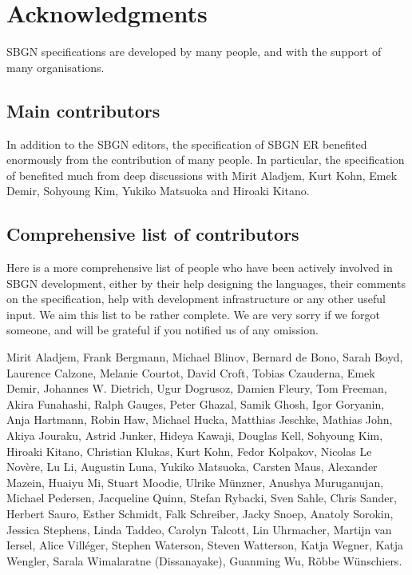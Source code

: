 \chapter{Acknowledgments}\label{sec:acknowledgments}

SBGN specifications are developed by many people, and with the support of many organisations.

\section{Main contributors}

In addition to the SBGN editors, the specification of SBGN ER benefited enormously from the contribution of many people. In particular, the specification of \SBGNERLone benefited much from deep discussions with Mirit Aladjem, Kurt Kohn, Emek Demir, Sohyoung Kim, Yukiko Matsuoka and Hiroaki Kitano. 

\section{Comprehensive list of contributors}

Here is a more comprehensive list of people who have been actively involved in SBGN development, either by their help designing the languages, their comments on the specification, help with development infrastructure or any other useful input.  We aim this list to be rather complete. We are very sorry if we forgot someone, and will be grateful if you notified us of any omission.

Mirit Aladjem, Frank Bergmann, Michael Blinov, Bernard de Bono, Sarah Boyd, Laurence Calzone, Melanie Courtot, David Croft, Tobias Czauderna, Emek Demir, Johannes W. Dietrich, Ugur Dogrusoz, Damien Fleury, Tom Freeman, Akira Funahashi, Ralph Gauges, Peter Ghazal, Samik Ghosh, Igor Goryanin, Anja Hartmann, Robin Haw, Michael Hucka, Matthias Jeschke, Mathias John, Akiya Jouraku, Astrid Junker, Hideya Kawaji, Douglas Kell, Sohyoung Kim, Hiroaki Kitano, Christian Klukas, Kurt Kohn, Fedor Kolpakov, Nicolas Le Nov\`{e}re, Lu Li, Augustin Luna, Yukiko Matsuoka, Carsten Maus, Alexander Mazein, Huaiyu Mi, Stuart Moodie, Ulrike Münzner, Anushya Muruganujan, Michael Pedersen, Jacqueline Quinn, Stefan Rybacki, Sven Sahle, Chris Sander, Herbert Sauro, Esther Schmidt, Falk Schreiber, Jacky Snoep, Anatoly Sorokin, Jessica Stephens, Linda Taddeo, Carolyn Talcott, Lin Uhrmacher, Martijn van Iersel, Alice Vill\'{e}ger, Stephen Waterson, Steven Watterson, Katja Wegner, Katja Wengler, Sarala Wimalaratne (Dissanayake), Guanming Wu, Röbbe Wünschiers.

